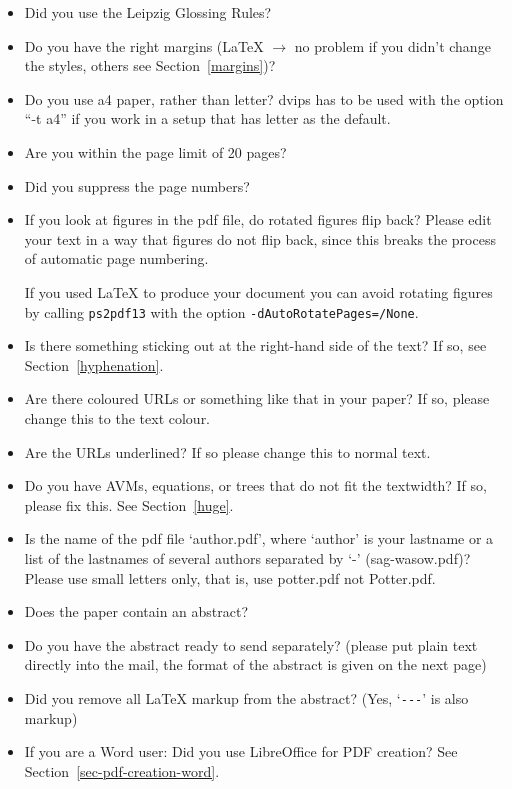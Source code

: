 \documentclass[11pt,a4paper,fleqn]{article}
\begin{document}
\begin{itemize}
\item Did you use the Leipzig Glossing Rules?
\item Do you have the right margins (\LaTeX{} $\to$ no problem if you didn't change
      the styles, others see Section~\ref{margins})?
\item Do you use a4 paper, rather than letter? dvips has to be used with the option ``-t a4'' if you
  work in a setup that has letter as the default.
\item Are you within the page limit of 20 pages?
\item Did you suppress the page numbers?
\item If you look at figures in the pdf file, do rotated figures flip back?
      Please edit your text in a way that figures do not flip back, since this
      breaks the process of automatic page numbering.

If you used \LaTeX{} to produce your document you can avoid rotating figures by calling
\verb+ps2pdf13+ with the option \verb+-dAutoRotatePages=/None+.
\item Is there something sticking out at the right-hand side of the text?
      If so, see Section~\ref{hyphenation}.
\item Are there coloured URLs or something like that in your paper? If so,
      please change this to the text colour.
\item Are the URLs underlined? If so please change this to normal text.
\item Do you have AVMs, equations, or trees that do not fit the textwidth?
      If so, please fix this. See Section~\ref{huge}.
\item Is the name of the pdf file `author.pdf', where `author' is your lastname or a list of the lastnames of several authors
      separated by `-' (sag-wasow.pdf)? Please use small letters only, that is, use potter.pdf not Potter.pdf.
\item Does the paper contain an abstract?
\item Do you have the abstract ready to send separately? (please put plain text directly into the mail, the
format of the abstract is given on the next page)
\item Did you remove all \LaTeX{} markup from the abstract? (Yes, `\verb+---+' is also markup)
\item If you are a Word user: Did you use LibreOffice for PDF creation? See Section~\ref{sec-pdf-creation-word}.
\end{itemize}
\end{document}
